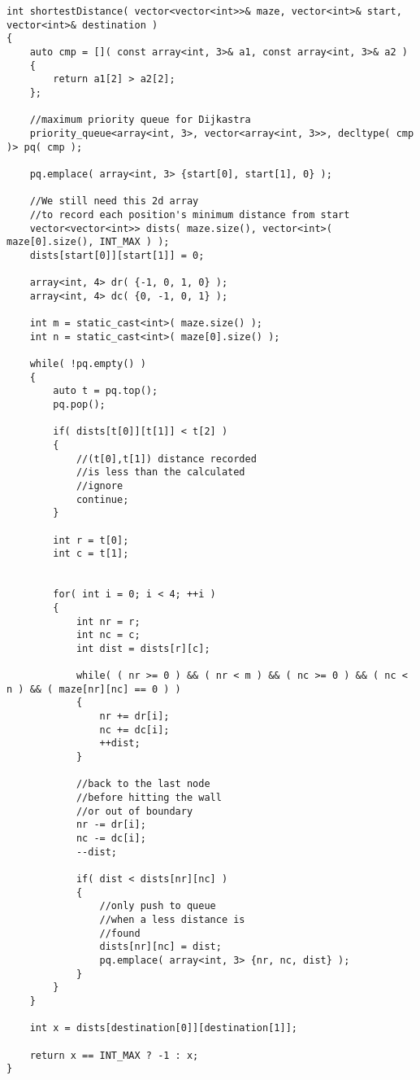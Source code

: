\begin{lstlisting}[style=customc, caption={Dijkastra Algorithm}]
int shortestDistance( vector<vector<int>>& maze, vector<int>& start, vector<int>& destination )
{
    auto cmp = []( const array<int, 3>& a1, const array<int, 3>& a2 )
    {
        return a1[2] > a2[2];
    };

    //maximum priority queue for Dijkastra
    priority_queue<array<int, 3>, vector<array<int, 3>>, decltype( cmp )> pq( cmp );

    pq.emplace( array<int, 3> {start[0], start[1], 0} );

    //We still need this 2d array
    //to record each position's minimum distance from start
    vector<vector<int>> dists( maze.size(), vector<int>( maze[0].size(), INT_MAX ) );
    dists[start[0]][start[1]] = 0;

    array<int, 4> dr( {-1, 0, 1, 0} );
    array<int, 4> dc( {0, -1, 0, 1} );

    int m = static_cast<int>( maze.size() );
    int n = static_cast<int>( maze[0].size() );

    while( !pq.empty() )
    {
        auto t = pq.top();
        pq.pop();

        if( dists[t[0]][t[1]] < t[2] )
        {
            //(t[0],t[1]) distance recorded
            //is less than the calculated
            //ignore
            continue;
        }

        int r = t[0];
        int c = t[1];


        for( int i = 0; i < 4; ++i )
        {
            int nr = r;
            int nc = c;
            int dist = dists[r][c];

            while( ( nr >= 0 ) && ( nr < m ) && ( nc >= 0 ) && ( nc < n ) && ( maze[nr][nc] == 0 ) )
            {
                nr += dr[i];
                nc += dc[i];
                ++dist;
            }

            //back to the last node
            //before hitting the wall
            //or out of boundary
            nr -= dr[i];
            nc -= dc[i];
            --dist;

            if( dist < dists[nr][nc] )
            {
                //only push to queue
                //when a less distance is
                //found
                dists[nr][nc] = dist;
                pq.emplace( array<int, 3> {nr, nc, dist} );
            }
        }
    }

    int x = dists[destination[0]][destination[1]];

    return x == INT_MAX ? -1 : x;
}
\end{lstlisting}

